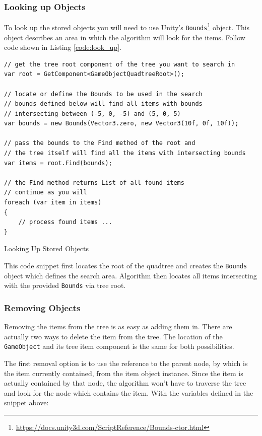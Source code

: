 \documentclass{article}
\begin{document}
\subsubsection{Looking up Objects} \label{usage:code:find}
To look up the stored objects you will need to use Unity's \texttt{Bounds}\footnote{\url{https://docs.unity3d.com/ScriptReference/Bounds-ctor.html}} object.
This object describes an area in which the algorithm will look for the items.
Follow code shown in Listing \ref{code:look_up}.

\begin{listing}[H]
    \begin{verbatim}
// get the tree root component of the tree you want to search in
var root = GetComponent<GameObjectQuadtreeRoot>();

// locate or define the Bounds to be used in the search
// bounds defined below will find all items with bounds
// intersecting between (-5, 0, -5) and (5, 0, 5)
var bounds = new Bounds(Vector3.zero, new Vector3(10f, 0f, 10f));

// pass the bounds to the Find method of the root and
// the tree itself will find all the items with intersecting bounds
var items = root.Find(bounds);

// the Find method returns List of all found items
// continue as you will
foreach (var item in items)
{
    // process found items ...
}
    \end{verbatim}
    \vspace{-1em}
    \caption{Looking Up Stored Objects} \label{code:look_up}
    \smallskip\small\centering
    This code snippet first locates the root of the quadtree and creates the \texttt{Bounds} object which defines the search area.
    Algorithm then locates all items intersecting with the provided \texttt{Bounds} via tree root.
\end{listing}


\subsubsection{Removing Objects} \label{usage:code:remove}
Removing the items from the tree is as easy as adding them in.
There are actually two ways to delete the item from the tree.
The location of the \texttt{GameObject} and its tree item component is the same for both possibilities.

The first removal option is to use the reference to the parent node, by which is the item currently contained, from the item object instance.
Since the item is actually contained by that node, the algorithm won't have to traverse the tree and look for the node which contains the item.
With the variables defined in the snippet above:
\end{document}
